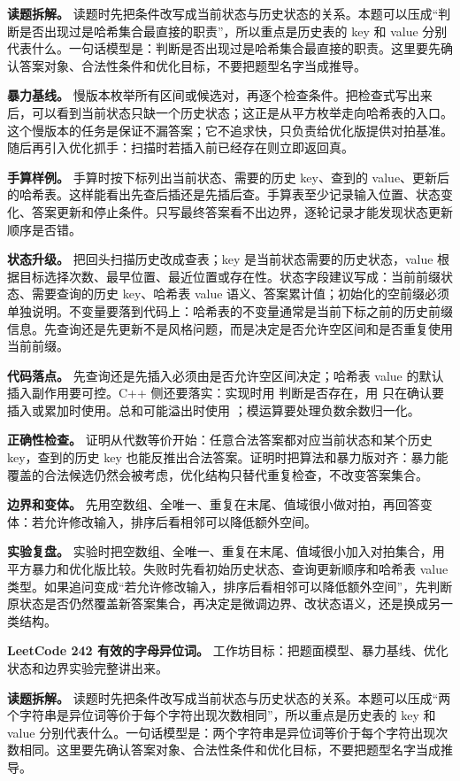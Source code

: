 \textbf{读题拆解。} 读题时先把条件改写成当前状态与历史状态的关系。本题可以压成“判断是否出现过是哈希集合最直接的职责”，所以重点是历史表的 key 和 value 分别代表什么。一句话模型是：判断是否出现过是哈希集合最直接的职责。这里要先确认答案对象、合法性条件和优化目标，不要把题型名字当成推导。

\textbf{暴力基线。} 慢版本枚举所有区间或候选对，再逐个检查条件。把检查式写出来后，可以看到当前状态只缺一个历史状态；这正是从平方枚举走向哈希表的入口。这个慢版本的任务是保证不漏答案；它不追求快，只负责给优化版提供对拍基准。随后再引入优化抓手：扫描时若插入前已经存在则立即返回真。

\textbf{手算样例。} 手算时按下标列出当前状态、需要的历史 key、查到的 value、更新后的哈希表。这样能看出先查后插还是先插后查。手算表至少记录输入位置、状态变化、答案更新和停止条件。只写最终答案看不出边界，逐轮记录才能发现状态更新顺序是否错。

\textbf{状态升级。} 把回头扫描历史改成查表；key 是当前状态需要的历史状态，value 根据目标选择次数、最早位置、最近位置或存在性。状态字段建议写成：当前前缀状态、需要查询的历史 key、哈希表 value 语义、答案累计值；初始化的空前缀必须单独说明。不变量要落到代码上：哈希表的不变量通常是当前下标之前的历史前缀信息。先查询还是先更新不是风格问题，而是决定是否允许空区间和是否重复使用当前前缀。

\textbf{代码落点。} 先查询还是先插入必须由是否允许空区间决定；哈希表 value 的默认插入副作用要可控。C++ 侧还要落实：实现时用  判断是否存在，用  只在确认要插入或累加时使用。总和可能溢出时使用 ；模运算要处理负数余数归一化。

\textbf{正确性检查。} 证明从代数等价开始：任意合法答案都对应当前状态和某个历史 key，查到的历史 key 也能反推出合法答案。证明时把算法和暴力版对齐：暴力能覆盖的合法候选仍然会被考虑，优化结构只替代重复检查，不改变答案集合。

\textbf{边界和变体。} 先用空数组、全唯一、重复在末尾、值域很小做对拍，再回答变体：若允许修改输入，排序后看相邻可以降低额外空间。

\textbf{实验复盘。} 实验时把空数组、全唯一、重复在末尾、值域很小加入对拍集合，用平方暴力和优化版比较。失败时先看初始历史状态、查询更新顺序和哈希表 value 类型。如果追问变成“若允许修改输入，排序后看相邻可以降低额外空间”，先判断原状态是否仍然覆盖新答案集合，再决定是微调边界、改状态语义，还是换成另一类结构。

\noindent\textbf{LeetCode 242 有效的字母异位词。} 工作坊目标：把题面模型、暴力基线、优化状态和边界实验完整讲出来。

\textbf{读题拆解。} 读题时先把条件改写成当前状态与历史状态的关系。本题可以压成“两个字符串是异位词等价于每个字符出现次数相同”，所以重点是历史表的 key 和 value 分别代表什么。一句话模型是：两个字符串是异位词等价于每个字符出现次数相同。这里要先确认答案对象、合法性条件和优化目标，不要把题型名字当成推导。

